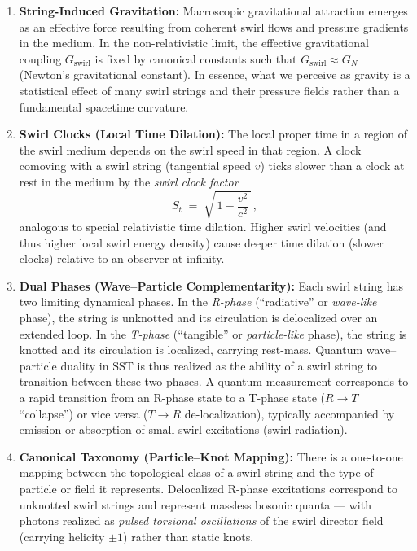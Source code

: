 \documentclass[10pt,reprint,aps,onecolumn,nofootinbib]{revtex4-2}
\begin{document}
\begin{enumerate}
    \textit{Rosetta remark.} In the linear mapping to conventional superfluid notation, the circulation quantum
    $\Gamma_0$ matches the Onsager–Feynman value $h/m_{\text{eff}}$ for the relevant excitation, but within SST
    we treat $\Gamma_0$ as primitive and regard $h$ as a derived quantity.
    \item \textbf{String-Induced Gravitation:} Macroscopic gravitational attraction emerges as an effective force resulting from coherent swirl flows and pressure gradients in the medium. In the non-relativistic limit, the effective gravitational coupling $G_{\text{swirl}}$ is fixed by canonical constants such that $G_{\text{swirl}} \approx G_N$ (Newton’s gravitational constant). In essence, what we perceive as gravity is a statistical effect of many swirl strings and their pressure fields rather than a fundamental spacetime curvature.
    \item \textbf{Swirl Clocks (Local Time Dilation):} The local proper time in a region of the swirl medium depends on the swirl speed in that region. A clock comoving with a swirl string (tangential speed $v$) ticks slower than a clock at rest in the medium by the \emph{swirl clock factor}
    \[
        S_t \;=\; \sqrt{\,1 - \frac{v^2}{c^2}\,}\,,
    \]
    analogous to special relativistic time dilation. Higher swirl velocities (and thus higher local swirl energy density) cause deeper time dilation (slower clocks) relative to an observer at infinity.
    \item \textbf{Dual Phases (Wave–Particle Complementarity):} Each swirl string has two limiting dynamical phases. In the \emph{R-phase} (“radiative” or \emph{wave-like} phase), the string is unknotted and its circulation is delocalized over an extended loop. In the \emph{T-phase} (“tangible” or \emph{particle-like} phase), the string is knotted and its circulation is localized, carrying rest-mass. Quantum wave–particle duality in SST is thus realized as the ability of a swirl string to transition between these two phases. A quantum measurement corresponds to a rapid transition from an R-phase state to a T-phase state ($R\to T$ “collapse”) or vice versa ($T\to R$ de-localization), typically accompanied by emission or absorption of small swirl excitations (swirl radiation).
    \item \textbf{Canonical Taxonomy (Particle–Knot Mapping):}
    There is a one-to-one mapping between the topological class of a swirl string and the type of particle or field it represents.
    Delocalized R-phase excitations correspond to unknotted swirl strings and represent massless bosonic quanta — with photons realized as \emph{pulsed torsional oscillations} of the swirl director field (carrying helicity $\pm 1$) rather than static knots.

\end{enumerate}
\end{document}
